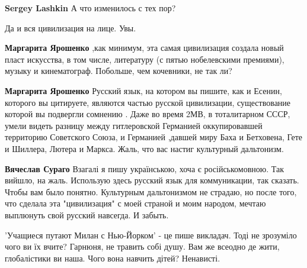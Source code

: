 \begin{itemize}
\begin{itemize}

\textbf{Sergey Lashkin} А что изменилось с тех пор?


Да и вся цивилизация на лице. Увы.


\textbf{Маргарита Ярошенко} ,как минимум, эта самая цивилизация создала новый пласт искусства, в том числе, литературу (с пятью нобелевскими премиями), музыку и кинематограф. Побольше, чем кочевники, не так ли?


\textbf{Маргарита Ярошенко} Русский язык, на котором вы пишите, как и Есенин, которого вы цитируете, являются частью русской цивилизации, существование которой вы подвергли сомнению . Даже во время 2МВ, в тоталитарном СССР, умели видеть разницу между гитлеровской Германией оккупировавшей территорию Советского Союза, и Германией ,давшей миру Баха и Бетховена, Гете и Шиллера, Лютера и Маркса. Жаль, что вас настиг культурный дальтонизм.


\textbf{Вячеслав Сураго} Взагалі я пишу українською, хоча є російськомовною. Так вийшло, на жаль. Использую здесь русский язык для коммуникации, так сказать. Чтобы вам было понятно. Культурным дальтонизмом не страдаю, но после того, что сделала эта "цивилизация" с моей страной и моим народом, мечтаю выплюнуть свой русский навсегда. И забыть.
\end{itemize}



'Учащиеся путают Милан с Нью-Йорком' - це пише викладач. Тоді не зрозуміло чого
ви їх вчите? Гарнюня, не травить собі душу. Вам же всеодно де жити,
глобалістики ви наша. Чого вона навчить дітей? Ненависті.

\begin{itemize}


\end{itemize}
\end{itemize}
